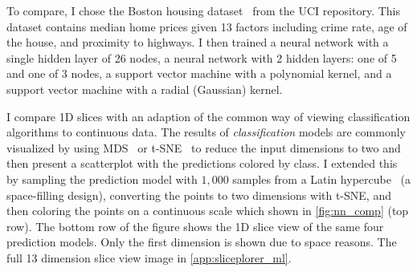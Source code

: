 To compare, I chose the Boston housing dataset~\cite{Lichman:2013} from the
UCI repository. This dataset contains median home prices
given 13 factors including crime rate, age of the house, and proximity to
highways. I then trained a neural network with a single hidden layer of 26
nodes, a neural network with 2 hidden layers: one of 5 and one of 3 nodes, a
support vector machine with a polynomial kernel, and a support vector machine
with a radial (Gaussian) kernel.

I compare 1D slices with an adaption of the common way of viewing
classification algorithms to continuous data.
The results of \emph{classification} models are commonly visualized
by using MDS~\cite{Kruskal:1964} or t-SNE~\cite{Maaten:2008} to reduce the input
dimensions to two and then present a scatterplot with the predictions colored
by class. I extended this by sampling the prediction model with \(1,000\)
samples from a Latin hypercube~\cite{Tang:1993} (a space-filling design),
converting the points to two dimensions with t-SNE, and then coloring the points
on a continuous scale which shown in \autoref{fig:nn_comp} (top row).  The
bottom row of the figure shows the 1D slice view of the same four prediction
models. Only the first dimension is shown due to space reasons. The full 13
dimension slice view image in \autoref{app:sliceplorer_ml}.

